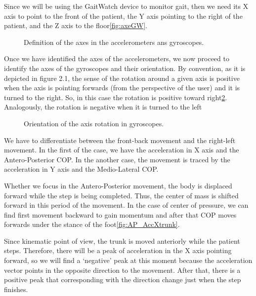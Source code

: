Since we will be using the GaitWatch device to monitor gait, then we need its X axis to point to the front of the patient, the Y axis pointing to the right  of the patient, and the Z axis to the floor\ref{fig:axeGW}.\cite{OlivaresBotzel2013}

\begin{figure}[H]
	\centering
	\caption{Definition of the axes in the accelerometers ans gyroscopes.}
	\label{fig:axesGW}
\end{figure}

Once we have identified the axes of the accelerometers, we now proceed to identify the axes of the gyroscopes and their orientation. By convention, as it is depicted in figure 2.1, the sense of the rotation around a given axis is positive when the axis is pointing forwards (from the perspective of the user) and it is turned to the right. So, in this case the rotation is positive toward right\ref{fig:axesGWGyro}. Analogously, the rotation is negative when it is turned to the left  \cite{OlivaresBotzel2013}

\begin{figure}[H]
	\centering
	\caption{Orientation of the axis rotation in gyroscopes.}
	\label{fig:axesGWGyro}
\end{figure}


We have to differentiate between the front-back movement and the right-left movement. In the first of the case, we have the acceleration in X axis and the Antero-Posterior COP. In the another case, the movement is traced by the acceleration in Y axis and the Medio-Lateral  COP.

Whether we focus in the Antero-Posterior movement, the body is displaced forward while the step is being completed. Thus, the center of mass is shifted forward in this period of the movement. In the case of center of pressure, we can find first  movement backward to gain momentum and after that  COP moves forwards under the stance of the foot\ref{fig:AP_AccXtrunk}.

Since kinematic point of view, the trunk is moved anteriorly while the patient steps. Therefore, there will be a peak of acceleration in the X axis pointing forward, so we will find a ‘negative’ peak at this moment because the acceleration vector points in the opposite direction to the movement. After that, there is a positive peak that corresponding with the direction change just when the step finishes. 


